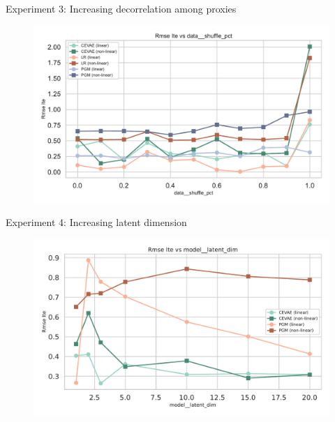 \documentclass[10pt]{beamer}
\begin{document}
\begin{frame}{Experiment 3: Increasing decorrelation among proxies}
    \begin{figure}[H]
      \includegraphics[width=\textwidth]{images/MyRun_data__shuffle_pct--rmse_ite.pdf}
    \end{figure}

\end{frame}

\begin{frame}{Experiment 4: Increasing latent dimension}
    \begin{figure}[H]
      \includegraphics[width=\textwidth]{images/MyRun_model__latent_dim--rmse_ite.pdf}
    \end{figure}
\end{frame}
\end{document}
